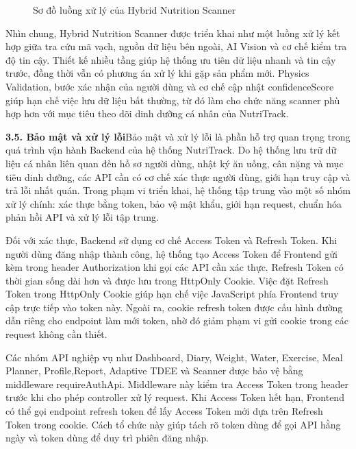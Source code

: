 \begin{figure}[!htbp]
    \caption{Sơ đồ luồng xử lý của Hybrid Nutrition Scanner}
    \label{fig:hybrid_scanner_flow}
\end{figure}

Nhìn chung, Hybrid Nutrition Scanner được triển khai như một luồng xử lý kết hợp giữa tra cứu mã vạch, nguồn dữ liệu bên ngoài, AI Vision và cơ chế kiểm tra độ tin cậy. Thiết kế nhiều tầng giúp hệ thống ưu tiên dữ liệu nhanh và tin cậy trước, đồng thời vẫn có phương án xử lý khi gặp sản phẩm mới. Physics Validation, bước xác nhận của người dùng và cơ chế cập nhật confidenceScore giúp hạn chế việc lưu dữ liệu bất thường, từ đó làm cho chức năng scanner phù hợp hơn với mục tiêu theo dõi dinh dưỡng cá nhân của NutriTrack.

\textbf{3.5. Bảo mật và xử lý lỗi}Bảo mật và xử lý lỗi là phần hỗ trợ quan trọng trong quá trình vận hành Backend của hệ thống NutriTrack. Do hệ thống lưu trữ dữ liệu cá nhân liên quan đến hồ sơ người dùng, nhật ký ăn uống, cân nặng và mục tiêu dinh dưỡng, các API cần có cơ chế xác thực người dùng, giới hạn truy cập và trả lỗi nhất quán. Trong phạm vi triển khai, hệ thống tập trung vào một số nhóm xử lý chính: xác thực bằng token, bảo vệ mật khẩu, giới hạn request, chuẩn hóa phản hồi API và xử lý lỗi tập trung.

Đối với xác thực, Backend sử dụng cơ chế Access Token và Refresh Token. Khi người dùng đăng nhập thành công, hệ thống tạo Access Token để Frontend gửi kèm trong header Authorization khi gọi các API cần xác thực. Refresh Token có thời gian sống dài hơn và được lưu trong HttpOnly Cookie. Việc đặt Refresh Token trong HttpOnly Cookie giúp hạn chế việc JavaScript phía Frontend truy cập trực tiếp vào token này. Ngoài ra, cookie refresh token được cấu hình đường dẫn riêng cho endpoint làm mới token, nhờ đó giảm phạm vi gửi cookie trong các request không cần thiết.

Các nhóm API nghiệp vụ như Dashboard, Diary, Weight, Water, Exercise, Meal Planner, Profile,Report, Adaptive TDEE và Scanner được bảo vệ bằng middleware requireAuthApi. Middleware này kiểm tra Access Token trong header trước khi cho phép controller xử lý request. Khi Access Token hết hạn, Frontend có thể gọi endpoint refresh token để lấy Access Token mới dựa trên Refresh Token trong cookie. Cách tổ chức này giúp tách rõ token dùng để gọi API hằng ngày và token dùng để duy trì phiên đăng nhập.

